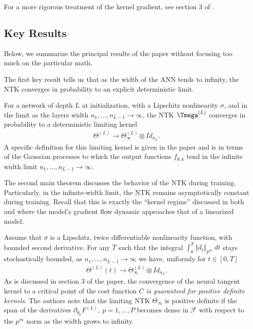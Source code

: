 \documentclass{article}
\newenvironment{manualtheorem}[1]{%
  \renewcommand\themanualtheoreminner{#1}%
  \manualtheoreminner
}{\endmanualtheoreminner}
\begin{document}
For a more rigorous treatment of the kernel gradient, see section 3 of \cite{woodworth2020kernel}.

\subsection{Key Results}
Below, we summarize the principal results of the paper without focusing too much on the particular math. 

The first key result tells us that as the width of the ANN tends to infinity, the NTK converges in probability to an explicit deterministic limit.
\begin{manualtheorem}{1}
For a network of depth $L$ at initialization, with a Lipschitz nonlinearity $\sigma$, and in the limit as the layers width $n_1, \ldots, n_{L-1} \rightarrow \infty$, the NTK $\Tmega^{(L)}$ converges in probability to a deterministic limiting kernel
\begin{align*}
    \Theta^{(L)} \rightarrow \Theta_{\infty}^{(L)} \otimes Id_{n_L}.
\end{align*}
\end{manualtheorem}
A specific definition for this limiting kernel is given in the paper and is in terms of the Gaussian processes to which the output functions $f_{\theta, k}$ tend in the infinite width limit $n_1, \ldots, n_{L-1} \rightarrow \infty$.

The second main theorem discusses the behavior of the NTK during training. Particularly, in the infinite-width limit, the NTK remains asymptotically constant during training. Recall that this is exactly the \enquote{kernel regime} discussed in both \cite{woodworth2020kernel} and \cite{chizat2018lazy} where the model's gradient flow dynamic approaches that of a linearized model.
\begin{manualtheorem}{2}
Assume that $\sigma$ is a Lipschitz, twice differentiable nonlinearity function, with bounded second derivative. For any $T$ such that the integral $\int_0^T \left\Vert d_t \right\Vert_{p^{in}} \ dt$ stays stochastically bounded, as $n_1, \ldots, n_{L-1} \rightarrow \infty$ we have, uniformly for $t \in [0, T]$
\begin{align*}
    \Theta^{(L)}(t) \rightarrow \Theta_{\infty}^{(L)} \otimes Id_{n_L}.
\end{align*}
\end{manualtheorem}
As is discussed in section 3 of the paper, the convergence of the neural tangent kernel to a critical point of the cost function $C$ \textit{is guaranteed for positive definite kernels}. The authors note that the limiting NTK $\Theta_{\infty}$ is positive definite if the span of the derivatives $\partial_{\theta_p}F^{(L)}, \ p = 1, \ldots, P$ becomes dense in $\mathcal{F}$ with respect to the $p^{in}$ norm as the width grows to infinity.
\end{document}
